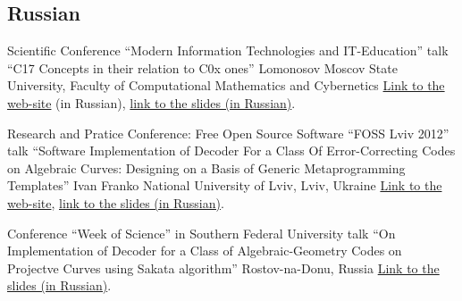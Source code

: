 \documentclass[11pt,a4paper]{moderncv}   %
\newcommand{\CPP}
{C\nolinebreak[4]\hspace{-.05em}\raisebox{.35ex}{\scriptsize\bfseries +\hspace{-.05em}+}}
\newcommand{\myhref}[2]{\textcolor{blue}{\href{#1}{#2}}}
\begin{document}
{\footnotesize
\subsection{Russian}

%
    {Scientific Conference “Modern Information Technologies and IT-Education”}%
    {talk “\protect\CPP{}17 Concepts in their relation to \protect\CPP{}0x ones”}
    {Lomonosov Moscov State University, Faculty of Computational Mathematics and Cybernetics}{}%
    {\myhref{http://conf.it-edu.ru/conference/2015/programm}{Link to the web-site} (in Russian),
\myhref{http://staff.mmcs.sfedu.ru/~ulysses/Papers/Talks/2015-SITITO-Cpp1z-concepts.pdf}{link to the slides (in Russian)}.}

%
    {Research and Pratice Conference: Free Open Source Software “FOSS Lviv 2012”}%
    {talk “Software Implementation of Decoder For a Class Of Error-Correcting Codes on Algebraic Curves: Designing on a Basis of Generic Metaprogramming Templates”}%
    {Ivan Franko National University of Lviv, Lviv, Ukraine}{}%
    {\myhref{http://conference.linux.lviv.ua/en/main}{Link to the web-site},
\myhref{http://mmcs.sfedu.ru/~ulysses/Papers/Talks/2012-FOSS-Lviv.pdf}{link to the slides (in Russian)}.}

%
    {Conference “Week of Science” in Southern Federal University}%
    {talk “On Implementation of Decoder for a Class of Algebraic-Geometry Codes on Projectve Curves using Sakata algorithm”}%
    {Rostov-na-Donu, Russia}{}%
    {\myhref{http://mmcs.sfedu.ru/~ulysses/Papers/Talks/2008-SFedU-SciWeek-slides.pdf}{Link to the slides (in Russian)}.}
}
\end{document}
